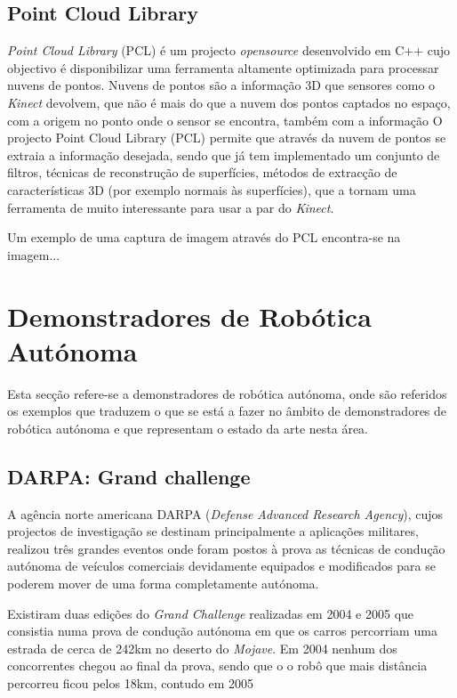 \subsection[PCL]{Point Cloud Library}

\emph{Point Cloud Library} (PCL) é um projecto \emph{opensource} desenvolvido em C++ 
cujo objectivo é disponibilizar uma ferramenta altamente optimizada para 
processar nuvens de pontos. Nuvens de pontos são a informação 3D que sensores 
como o \emph{Kinect} devolvem, que não é mais do que a nuvem dos pontos captados no espaço,
com a origem no ponto onde o sensor se encontra, também com a informação 
O projecto Point Cloud Library (PCL) \cite{Rusu_ICRA2011_PCL} permite que
através da nuvem de pontos se extraia a informação desejada, sendo que
já tem implementado um conjunto de filtros, técnicas de reconstrução de
superfícies, métodos de extracção de características 3D (por exemplo
normais às superfícies), que a tornam uma ferramenta de muito interessante para usar
a par do \emph{Kinect}.


Um exemplo de uma captura de imagem através do PCL encontra-se na imagem...


\section{Demonstradores de Robótica Autónoma}
Esta secção refere-se a demonstradores de robótica autónoma, onde são referidos
os exemplos que traduzem o que se está a fazer no âmbito de demonstradores de
robótica autónoma e que representam o estado da arte nesta área.


\subsection{DARPA: Grand challenge}
A agência norte americana DARPA (\emph{Defense Advanced Research Agency}), cujos projectos de
investigação se destinam principalmente a aplicações militares, realizou três grandes
eventos onde foram postos à prova as técnicas de condução autónoma de veículos
comerciais devidamente equipados e modificados para se poderem mover de uma forma
completamente autónoma.  

Existiram duas edições do \emph{Grand Challenge} realizadas em 2004 e 2005 que consistia
numa prova de condução autónoma em que os carros percorriam uma estrada de cerca
de 242km no deserto do \emph{Mojave}. Em 2004 nenhum dos concorrentes chegou ao final da
prova, sendo que o o robô que mais distância percorreu ficou pelos 18km, contudo em 2005

